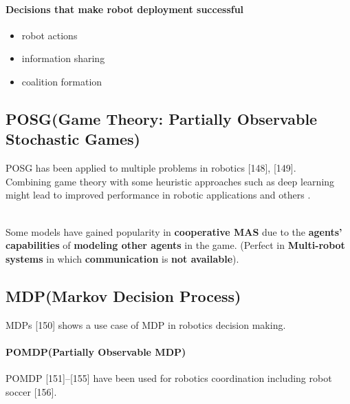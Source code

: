 \documentclass{article}
\begin{document}
   		\paragraph{Decisions that make robot deployment successful}
   			\begin{itemize}
   				\item  robot actions
   				\item  information sharing
   				\item  coalition formation
   			\end{itemize}
   		
   		
   		\subsection{POSG(Game Theory: Partially Observable Stochastic Games)}
   		POSG has been applied to multiple problems in robotics \citet{rizk-2019-cooperative-heterogeneous-multi-robot-systems-a-survey}[148], \citet{rizk-2019-cooperative-heterogeneous-multi-robot-systems-a-survey}[149]. 
   		\\
   		Combining game theory with some heuristic approaches such as deep learning might lead to improved performance in robotic applications and others \citep{rizk-2018-decision-making-in-multiagent-systems-a-survey}.
   		
   		\\
   		Some models have gained popularity in \textbf{cooperative MAS} due to the \textbf{agents’ capabilities} of \textbf{modeling other agents} in the game. (Perfect in \textbf{Multi-robot systems} in which \textbf{communication} is \textbf{not available})\citep{rizk-2018-decision-making-in-multiagent-systems-a-survey}.
   		
   		\subsection{MDP(Markov Decision Process)}
   			MDPs \citet{rizk-2019-cooperative-heterogeneous-multi-robot-systems-a-survey}[150] shows a use case of MDP in robotics decision making.  
   			
   			\paragraph{POMDP(Partially Observable MDP)} POMDP \cite{rizk-2018-decision-making-in-multiagent-systems-a-survey}[151]–[155] have been used for robotics coordination including robot soccer \citet{rizk-2018-decision-making-in-multiagent-systems-a-survey}[156].
   			
\end{document}
